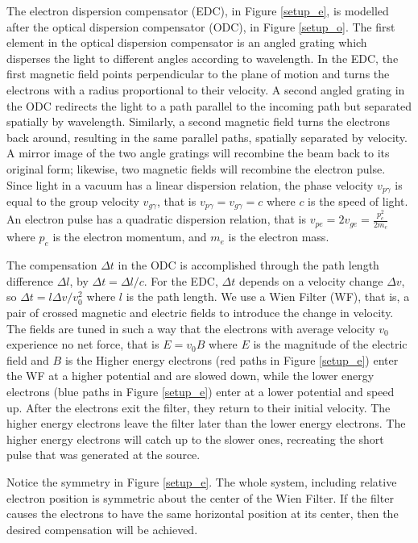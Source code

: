 \documentclass[12pt,letterpaper]{article}
\newcommand{\dv}{\Delta v}
\begin{document}
The electron dispersion compensator (EDC), in Figure \ref{setup_e}, is modelled after the optical dispersion compensator (ODC), in Figure \ref{setup_o}.  
The first element in the optical dispersion compensator is an angled grating which disperses the light to different angles according to wavelength.  
In the EDC, the first magnetic field points perpendicular to the plane of motion and turns the electrons with a radius proportional to their velocity. 
A second angled grating in the ODC redirects the light to a path parallel to the incoming path but separated spatially by wavelength. 
Similarly, a second magnetic field turns the electrons back around, resulting in the same parallel paths, spatially separated by velocity. 
A mirror image of the two angle gratings will recombine the beam back to its original form; likewise, two magnetic fields will recombine the electron pulse. 
Since light in a vacuum has a linear dispersion relation, the phase velocity $v_{p\gamma}$ is equal to the group velocity $v_{g\gamma}$, that is $v_{p\gamma}=v_{g\gamma}=c$ where $c$ is the speed of light. 
An electron pulse has a quadratic dispersion relation, that is $v_{pe} = 2 v_{ge} = \frac{p_e^2}{2m_e}$ where $p_e$ is the electron momentum, and $m_e$ is the electron mass.

The compensation $\Delta t$ in the ODC is accomplished through the path length difference $\Delta l$, by $\Delta t=\Delta l/c$. 
For the EDC, $\Delta t$ depends on a velocity change $\Delta v$, so $\Delta t = l\dv /v_0^2$ where $l$ is the path length. 
We use a Wien Filter (WF), that is, a pair of crossed magnetic and electric fields to introduce the change in velocity.
The fields are tuned in such a way that the electrons with average velocity $v_0$ experience no net force, that is $E=v_0 B$ where $E$ is the magnitude of the electric field and $B$ is the 
Higher energy electrons (red paths in Figure \ref{setup_e}) enter the WF at a higher potential and are slowed down, while the lower energy electrons (blue paths in Figure \ref{setup_e}) enter at a lower potential and speed up. 
After the electrons exit the filter, they return to their initial velocity.
The higher energy electrons leave the filter later than the lower energy electrons.
The higher energy electrons will catch up to the slower ones, recreating the short pulse that was generated at the source. 

Notice the symmetry in Figure \ref{setup_e}. 
The whole system, including relative electron position is symmetric about the center of the Wien Filter. 
If the filter causes the electrons to have the same horizontal position at its center, then the desired compensation will be achieved. 
\end{document}
